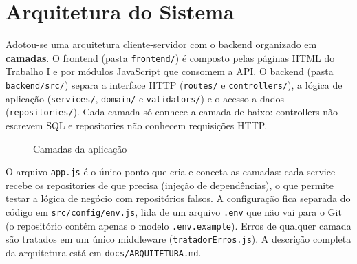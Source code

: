 \documentclass[12pt,a4paper]{article}
\newcommand{\cod}[1]{\texttt{#1}}
\begin{document}
\section{Arquitetura do Sistema}

Adotou-se uma arquitetura cliente-servidor com o backend organizado em
\textbf{camadas}. O frontend (pasta \cod{frontend/}) é composto pelas páginas
HTML do Trabalho I e por módulos JavaScript que consomem a API. O backend (pasta
\cod{backend/src/}) separa a interface HTTP (\cod{routes/} e \cod{controllers/}),
a lógica de aplicação (\cod{services/}, \cod{domain/} e \cod{validators/}) e o
acesso a dados (\cod{repositories/}). Cada camada só conhece a camada de baixo:
controllers não escrevem SQL e repositories não conhecem requisições HTTP.

\begin{figure}[H]
\centering
{}
\caption{Camadas da aplicação}
\end{figure}

O arquivo \cod{app.js} é o único ponto que cria e conecta as camadas: cada
service recebe os repositories de que precisa (injeção de dependências), o que
permite testar a lógica de negócio com repositórios falsos. A configuração fica
separada do código em \cod{src/config/env.js}, lida de um arquivo \cod{.env} que
não vai para o Git (o repositório contém apenas o modelo \cod{.env.example}).
Erros de qualquer camada são tratados em um único middleware
(\cod{tratadorErros.js}). A descrição completa da arquitetura está em
\cod{docs/ARQUITETURA.md}.
\end{document}
